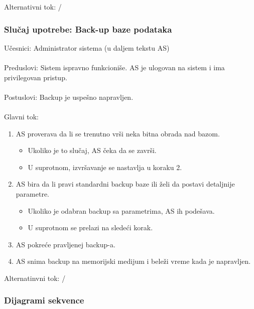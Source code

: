 \noindent Alternativni tok: /

\subsubsection{Slu\v caj upotrebe: Back-up baze podataka}


\label{su: backup}
\noindent U\v cesnici: Administrator sistema (u daljem tekstu AS)
\\
\\ Preduslovi: Sistem ispravno funkcioni\v se. AS je ulogovan na sistem i ima privilegovan pristup.
\\
\\ Postuslovi: Backup je uspe\v sno napravljen.
\\
\\ Glavni tok:
\begin{enumerate}
	\item AS proverava da li se trenutno vr\v si neka bitna obrada nad bazom.
	\begin{itemize}
		\item Ukoliko je to slu\v caj, AS \v ceka da se zavr\v si.
		\item U suprotnom, izvr\v savanje se nastavlja u koraku 2.
	\end{itemize}
	\item AS bira da li pravi standardni backup baze ili \v zeli da postavi detaljnije parametre.
	\begin{itemize}
		\item Ukoliko je odabran backup sa parametrima, AS ih pode\v sava.
		\item U suprotnom se prelazi na slede\' ci korak.
	\end{itemize}
	\item AS pokre\' ce pravljenej backup-a.
	\item AS snima backup na memorijski medijum i bele\v zi vreme kada je napravljen.
\end{enumerate}

\noindent Alternatinvni tok: /

\subsubsection{Dijagrami sekvence}

